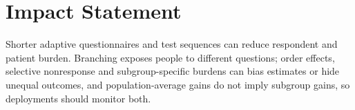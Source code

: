 \documentclass{article}
\begin{document}
\section*{Impact Statement}
Shorter adaptive questionnaires and test sequences can reduce respondent and patient burden. Branching exposes people to different questions; order effects, selective nonresponse and subgroup-specific burdens can bias estimates or hide unequal outcomes, and population-average gains do not imply subgroup gains, so deployments should monitor both.



\clearpage
\onecolumn
\raggedbottom
\appendix
{}

\end{document}
